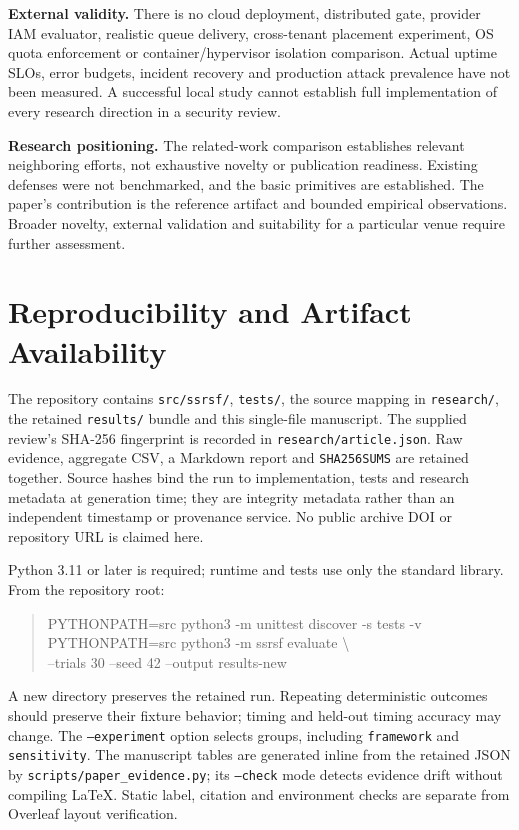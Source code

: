 \documentclass[11pt,a4paper]{article}
\begin{document}
\textbf{External validity.} There is no cloud deployment, distributed gate, provider IAM evaluator, realistic queue delivery, cross-tenant placement experiment, OS quota enforcement or container/hypervisor isolation comparison. Actual uptime SLOs, error budgets, incident recovery and production attack prevalence have not been measured. A successful local study cannot establish full implementation of every research direction in a security review.

\textbf{Research positioning.} The related-work comparison establishes relevant neighboring efforts, not exhaustive novelty or publication readiness. Existing defenses were not benchmarked, and the basic primitives are established. The paper's contribution is the reference artifact and bounded empirical observations. Broader novelty, external validation and suitability for a particular venue require further assessment.

\section{Reproducibility and Artifact Availability}\label{sec:artifact}
The repository contains \texttt{src/ssrsf/}, \texttt{tests/}, the source mapping in \texttt{research/}, the retained \texttt{results/} bundle and this single-file manuscript. The supplied review's SHA-256 fingerprint is recorded in \texttt{research/article.json}. Raw evidence, aggregate CSV, a Markdown report and \texttt{SHA256SUMS} are retained together. Source hashes bind the run to implementation, tests and research metadata at generation time; they are integrity metadata rather than an independent timestamp or provenance service. No public archive DOI or repository URL is claimed here.

Python 3.11 or later is required; runtime and tests use only the standard library. From the repository root:
\begin{quote}\small\ttfamily
PYTHONPATH=src python3 -m unittest discover -s tests -v\\
PYTHONPATH=src python3 -m ssrsf evaluate \textbackslash{}\\
\hspace*{1em}--trials 30 --seed 42 --output results-new
\end{quote}
A new directory preserves the retained run. Repeating deterministic outcomes should preserve their fixture behavior; timing and held-out timing accuracy may change. The \texttt{--experiment} option selects groups, including \texttt{framework} and \texttt{sensitivity}. The manuscript tables are generated inline from the retained JSON by \texttt{scripts/paper\_evidence.py}; its \texttt{--check} mode detects evidence drift without compiling LaTeX. Static label, citation and environment checks are separate from Overleaf layout verification.
\end{document}
